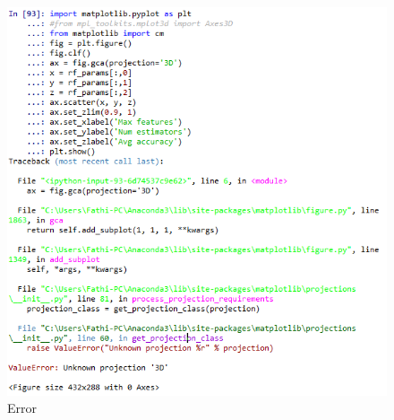 \begin{figure}[!htbp]
	\centering
	\includegraphics[width=1\textwidth]{figures/fathi/chapter4/hari2/10}
	\caption{Error}
	\label{error}
\end{figure}